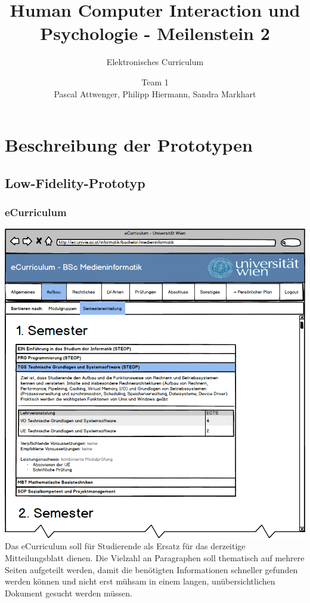 \documentclass[a4paper,10pt]{scrartcl}
\title{Human Computer Interaction und Psychologie - Meilenstein 2}
\subtitle{Elektronisches Curriculum}
\author{Team 1 \\Pascal Attwenger, Philipp Hiermann, Sandra Markhart}
\begin{document}
\maketitle

\section*{Beschreibung der Prototypen}

\subsection*{Low-Fidelity-Prototyp}

\subsubsection*{eCurriculum}

 \includegraphics[scale=0.4]{./lowfi-curriculum.png}\\
 
Das eCurriculum soll für Studierende als Ersatz für das derzeitige Mitteilungsblatt dienen. Die Vielzahl an Paragraphen soll thematisch auf mehrere Seiten aufgeteilt werden, damit die benötigten Informationen schneller gefunden werden können und nicht erst mühsam in einem langen, unübersichtlichen Dokument gesucht werden müssen.
\end{document}

